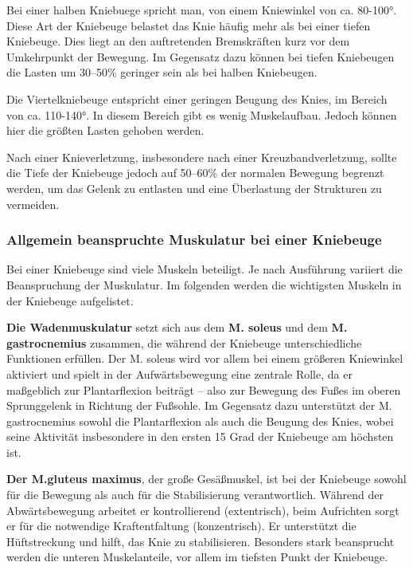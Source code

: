 \noindent Bei einer halben Kniebuege spricht man, von einem Kniewinkel von ca. 80-100°. \cite{Hartmann2014} Diese Art der Kniebeuge belastet das Knie häufig mehr als bei einer tiefen Kniebeuge. Dies liegt an den auftretenden Bremskräften kurz vor dem Umkehrpunkt der Bewegung. Im Gegensatz dazu können bei tiefen Kniebeugen die Lasten um 30–50\% geringer sein als bei halben Kniebeugen.\cite{Tiefe}

\noindent Die Viertelkniebeuge entspricht einer geringen Beugung des Knies, im Bereich von ca. 110-140°. \cite{Hartmann2014} In diesem Bereich gibt es wenig Muskelaufbau. Jedoch können hier die größten Lasten gehoben werden. \cite{Tiefe}

\noindent Nach einer Knieverletzung, insbesondere nach einer Kreuzbandverletzung, sollte die Tiefe der Kniebeuge jedoch auf 50–60\% der normalen Bewegung begrenzt werden, um das Gelenk zu entlasten und eine Überlastung der Strukturen zu vermeiden. \cite{Tiefe}

\subsubsection{Allgemein beanspruchte Muskulatur bei einer Kniebeuge}
\noindent Bei einer Kniebeuge sind viele Muskeln beteiligt. Je nach Ausführung variiert die Beanspruchung der Muskulatur. Im folgenden werden die wichtigsten Muskeln in der Kniebeuge aufgelistet. 

\noindent \textbf{Die Wadenmuskulatur} setzt sich aus dem \textbf{M. soleus} und dem \textbf{M. gastrocnemius} zusammen, die während der Kniebeuge unterschiedliche Funktionen erfüllen. Der M. soleus wird vor allem bei einem größeren Kniewinkel aktiviert und spielt in der Aufwärtsbewegung eine zentrale Rolle, da er maßgeblich zur Plantarflexion beiträgt – also zur Bewegung des Fußes im oberen Sprunggelenk in Richtung der Fußsohle. Im Gegensatz dazu unterstützt der M. gastrocnemius sowohl die Plantarflexion als auch die Beugung des Knies, wobei seine Aktivität insbesondere in den ersten 15 Grad der Kniebeuge am höchsten ist. \cite{Meinart}

\noindent \textbf{Der M.gluteus maximus}, der große Gesäßmuskel, ist bei der Kniebeuge sowohl für die Bewegung als auch für die Stabilisierung verantwortlich. Während der Abwärtsbewegung arbeitet er kontrollierend (extentrisch), beim Aufrichten sorgt er für die notwendige Kraftentfaltung (konzentrisch). Er unterstützt die Hüftstreckung und hilft, das Knie zu stabilisieren. Besonders stark beansprucht werden die unteren Muskelanteile, vor allem im tiefsten Punkt der Kniebeuge. \cite{Meinart}

